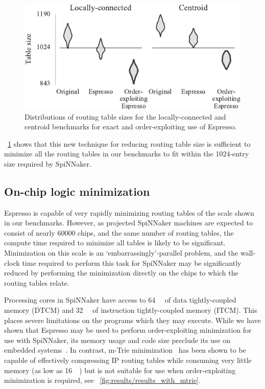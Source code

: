 \documentclass[conference]{IEEEtran}
\begin{document}
\begin{figure}
  \centering
  \includegraphics{experiments/results_with_dc}
  \caption{
    Distributions of routing table sizes for the locally-connected and centroid benchmarks for exact and order-exploiting use of Espresso.
  }
  \label{fig:results/espresso_with_dc}
\end{figure}

\figurename~\ref{fig:results/espresso_with_dc} shows that this new technique for reducing routing table size is sufficient to minimize all the routing tables in our benchmarks to fit within the 1024-entry size required by SpiNNaker.

\subsection*{On-chip logic minimization}

Espresso is capable of very rapidly minimizing routing tables of the scale shown in our benchmarks.
However, as projected SpiNNaker machines are expected to consist of nearly \num{60000} chips, and the same number of routing tables, the  compute time required to minimize all tables is likely to be significant.
Minimization on this scale is an `embarrassingly'-parallel problem, and the wall-clock time required to perform this task for SpiNNaker may be significantly reduced by performing the minimization directly on the chips to which the routing tables relate.

Processing cores in SpiNNaker have access to \SI{64}{\kibi\byte} of data tightly-coupled memory (DTCM) and \SI{32}{\kibi\byte} of instruction tightly-coupled memory (ITCM).
This places severe limitations on the programs which they may execute.
While we have shown that Espresso may be used to perform order-exploiting minimization for use with SpiNNaker, its memory usage and code size preclude its use on embedded systems~\parencite{Lysecky2003}.
In contrast, m-Trie minimization~\parencite{Ahmad2007} has been shown to be capable of effectively compressing IP routing tables while consuming very little memory (as low as \SI{16}{\kibi\byte}) but is not suitable for use when order-exploiting minimization is required, see \figurename~\ref{fig:results/results_with_mtrie}.
\end{document}
